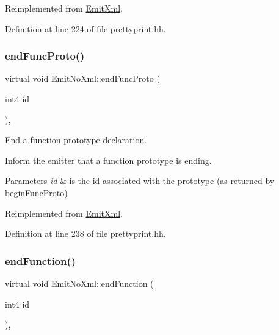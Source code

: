 Reimplemented from \mbox{\hyperlink{class_emit_xml_a8f2e7a4f2cd9fee90bed1eb966414424}{Emit\+Xml}}.



Definition at line 224 of file prettyprint.\+hh.

\mbox{\label{class_emit_no_xml_ae874ec5e673fd74f9770f90212a4e451}} 
\subsubsection{\texorpdfstring{endFuncProto()}{endFuncProto()}}
{\footnotesize\ttfamily virtual void Emit\+No\+Xml\+::end\+Func\+Proto (\begin{DoxyParamCaption}\item[{int4}]{id }\end{DoxyParamCaption})\hspace{0.3cm}{\ttfamily [inline]}, {\ttfamily [virtual]}}



End a function prototype declaration. 

Inform the emitter that a function prototype is ending. 
\begin{DoxyParams}{Parameters}
{\em id} & is the id associated with the prototype (as returned by begin\+Func\+Proto) \\
\hline
\end{DoxyParams}


Reimplemented from \mbox{\hyperlink{class_emit_xml_a0c1fad40b58e0a977f69ed80fb6f3bc8}{Emit\+Xml}}.



Definition at line 238 of file prettyprint.\+hh.

\mbox{\label{class_emit_no_xml_a1d592e201a320b55d3924aa676d0b1b6}} 
\subsubsection{\texorpdfstring{endFunction()}{endFunction()}}
{\footnotesize\ttfamily virtual void Emit\+No\+Xml\+::end\+Function (\begin{DoxyParamCaption}\item[{int4}]{id }\end{DoxyParamCaption})\hspace{0.3cm}{\ttfamily [inline]}, {\ttfamily [virtual]}}



